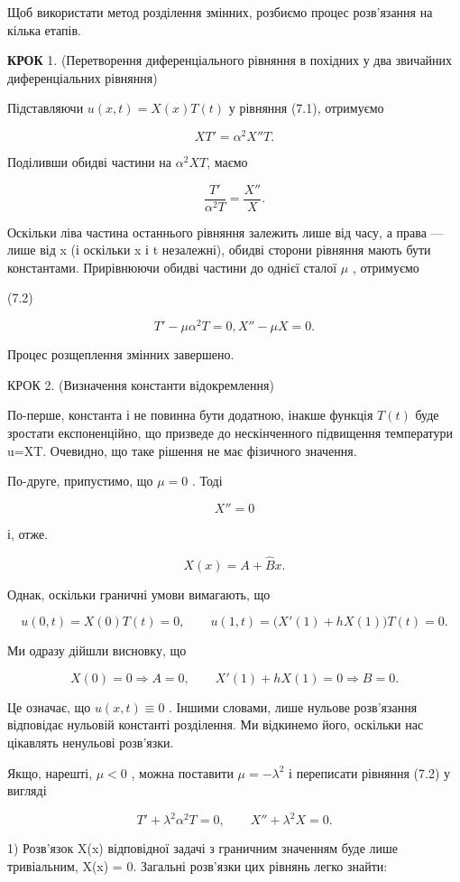 \documentclass[
  ukrainian,
]{article}
\begin{document}
Щоб використати метод розділення змінних, розбиємо процес розв'язання на
кілька етапів.

\textbf{КРОК} 1. (Перетворення диференціального рівняння в похідних у
два звичайних диференціальних рівняння)

Підставляючи \(u(x,t)=X(x)T(t)\) у рівняння (7.1), отримуємо

\[
XT'=\alpha^2X''T.
\]

Поділивши обидві частини на \(\alpha^2XT\), маємо

\[
\frac{T'}{\alpha^2 T} = \frac{X''}{X} .
\]

Оскільки ліва частина останнього рівняння залежить лише від часу, а
права --- лише від x (і оскільки x і t незалежні), обидві сторони
рівняння мають бути константами. Прирівнюючи обидві частини до однієї
сталої \(\mu\) , отримуємо

(7.2)

\[
T' - \mu \alpha^{2} T = 0, X'' - \mu X = 0.
\]

Процес розщеплення змінних завершено.

КРОК 2. (Визначення константи відокремлення)

По-перше, константа і не повинна бути додатною, інакше функція
\(T\left( t\right)\) буде зростати експоненційно, що призведе до
нескінченного підвищення температури u=XT. Очевидно, що таке рішення не
має фізичного значення.

По-друге, припустимо, що \(\mu = 0\) . Тоді

\[
X'' = 0
\]

і, отже.

\[
X(x) = A + \hat{B}x.
\]

Однак, оскільки граничні умови вимагають, що

\[
u(0, t) = X(0) T(t) = 0, \qquad u(1,t)=\bigl(X'(1)+hX(1)\bigr)T(t)=0.
\]

Ми одразу дійшли висновку, що

\[
X(0)=0\Rightarrow A=0,\qquad X'(1)+hX(1)=0\Rightarrow B=0.
\]

Це означає, що \(u(x, t) \equiv 0\) . Іншими словами, лише нульове
розв'язання відповідає нульовій константі розділення. Ми відкинемо його,
оскільки нас цікавлять ненульові розв'язки.

Якщо, нарешті, \(\mu < 0\) , можна поставити \(\mu = -\lambda^2\) і
переписати рівняння (7.2) у вигляді

\[
T' + \lambda^2 \alpha^2 T = 0, \qquad X'' + \lambda^2 X = 0.
\]

1) Розв'язок X(x) відповідної задачі з граничним значенням буде лише
тривіальним, X(x) = 0. Загальні розв'язки цих рівнянь легко знайти:
\end{document}
